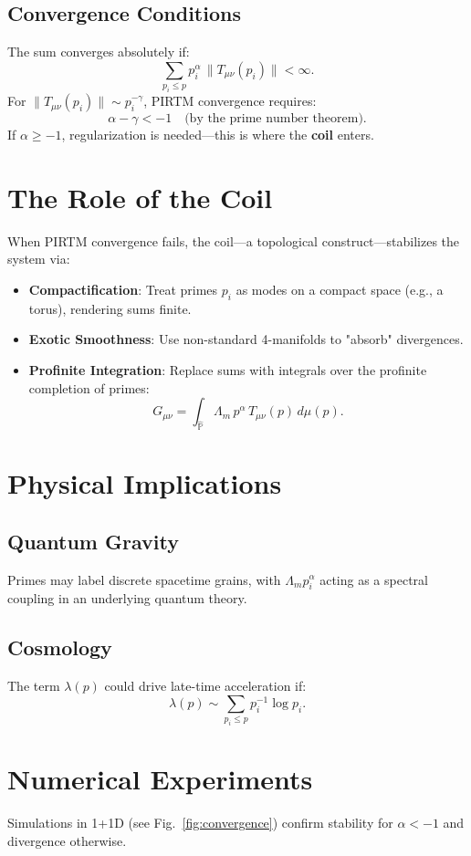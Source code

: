 \documentclass{article}
\theoremstyle{plain}
\theoremstyle{claimstyle}
\begin{document}
\subsection{Convergence Conditions}
The sum converges absolutely if:
\[
\sum_{p_i \leq p} p_i^\alpha \, \|T_{\mu\nu}(p_i)\| < \infty.
\]
For \( \|T_{\mu\nu}(p_i)\| \sim p_i^{-\gamma} \), PIRTM convergence requires:
\[
\alpha - \gamma < -1 \quad \text{(by the prime number theorem)}.
\]
If \( \alpha \geq -1 \), regularization is needed—this is where the \textbf{coil} enters.

\section{The Role of the Coil}
When PIRTM convergence fails, the coil—a topological construct—stabilizes the system via:
\begin{itemize}
    \item \textbf{Compactification}: Treat primes \( p_i \) as modes on a compact space (e.g., a torus), rendering sums finite.
    \item \textbf{Exotic Smoothness}: Use non-standard 4-manifolds to "absorb" divergences.
    \item \textbf{Profinite Integration}: Replace sums with integrals over the profinite completion of primes:
    \[
    G_{\mu\nu} = \int_{\hat{\mathbb{P}}} \Lambda_m \, p^\alpha \, T_{\mu\nu}(p) \, d\mu(p).
    \]
\end{itemize}

\section{Physical Implications}
\subsection{Quantum Gravity}
Primes may label discrete spacetime grains, with \( \Lambda_m p_i^\alpha \) acting as a spectral coupling in an underlying quantum theory.

\subsection{Cosmology}
The term \( \lambda(p) \) could drive late-time acceleration if:
\[
\lambda(p) \sim \sum_{p_i \leq p} p_i^{-1} \log p_i.
\]

\section{Numerical Experiments}
Simulations in 1+1D (see Fig.~\ref{fig:convergence}) confirm stability for \( \alpha < -1 \) and divergence otherwise.
\end{document}
